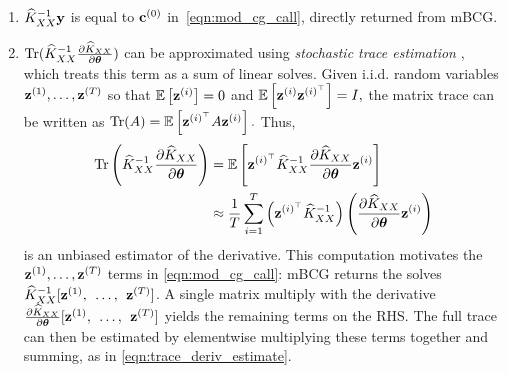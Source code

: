 \begin{enumerate}
  \item $\widehat{K}_{XX}^{-1}\mathbf{y}$ is equal to $\mathbf{c}^{(0)}$ in~\cref{eqn:mod_cg_call}, directly returned from mBCG.

  \item $\tr{ \trainK^{-1} \frac{\partial \trainK}{\partial \btheta} }$ can be approximated using \emph{stochastic trace estimation} \cite{hutchinson1990stochastic,fitzsimons2016improved}, which treats this term as a sum of linear solves.
    Given i.i.d. random variables $\mathbf{z}^{(1)}, \ldots, \mathbf{z}^{(T)}$ so that $\operatorname*{\mathbb{E}} \left[ \mathbf{z}^{(i)} \right]=0$ and $\operatorname*{\mathbb{E}} \left[ \mathbf{z}^{(i)} \mathbf{z}^{(i)^\top} \right]=I,
    $
    the matrix trace can be written as
    $
      \tr{\bA} = \Ev{\bz^{(i)^\top} \bA\bz^{(i)}}.
    $
    Thus,
    \begin{align}
      \tr{\trainK^{-1}\frac{\partial \trainK}{\partial \btheta}} &= \Ev{\bz^{(i)^\top} \trainK^{-1} \frac{\partial \trainK}{\partial \btheta} \bz^{(i)}}
      \nonumber \\
      &\approx \frac{1}{T}\sum_{i=1}^{T}\left(\bz^{(i)^\top} \trainK^{-1}\right)\left(\frac{\partial \trainK}{\partial \btheta}\bz^{(i)} \right)
      \label{eqn:trace_deriv_estimate}
    \end{align}
    is an unbiased estimator of the derivative. This computation motivates the $\mathbf{z}^{(1)}, \ldots, \mathbf{z}^{(T)}$ terms in \cref{eqn:mod_cg_call}:
    mBCG returns the solves $\widehat{K}_{XX}^{-1}[\mathbf{z}^{(1)}, \:\: \ldots, \:\: \mathbf{z}^{(T)}]$.
    A single matrix multiply with the derivative $\frac{\partial \widehat{K}_{XX}}{\partial \boldsymbol{\theta}}[\mathbf{z}^{(1)}, \:\: \ldots, \:\: \mathbf{z}^{(T)}]$ yields the remaining terms on the RHS.
    The full trace can then be estimated by elementwise multiplying these terms together and summing, as in \cref{eqn:trace_deriv_estimate}.


\end{enumerate}
